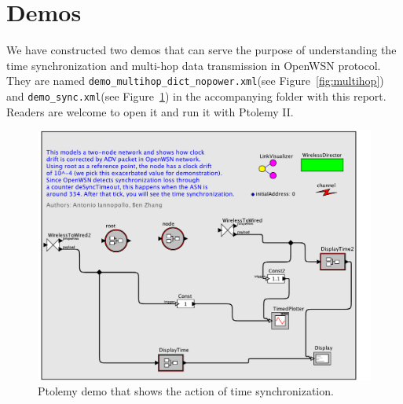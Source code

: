 \appendix
\section{Demos}

We have constructed two demos that can serve the purpose of understanding the time synchronization and multi-hop data transmission in OpenWSN protocol. They are named \verb+demo_multihop_dict_nopower.xml+(see Figure~\ref{fig:multihop}) and \verb+demo_sync.xml+(see Figure~\ref{fig:timesync}) in the accompanying folder with this report. Readers are welcome to open it and run it with Ptolemy II. 

\begin{figure}[t]
\centering
\includegraphics[width=0.9\columnwidth]{figures/PaperDemoSync}
\caption{\small Ptolemy demo that shows the action of time synchronization.}
\label{fig:timesync}
\end{figure}


